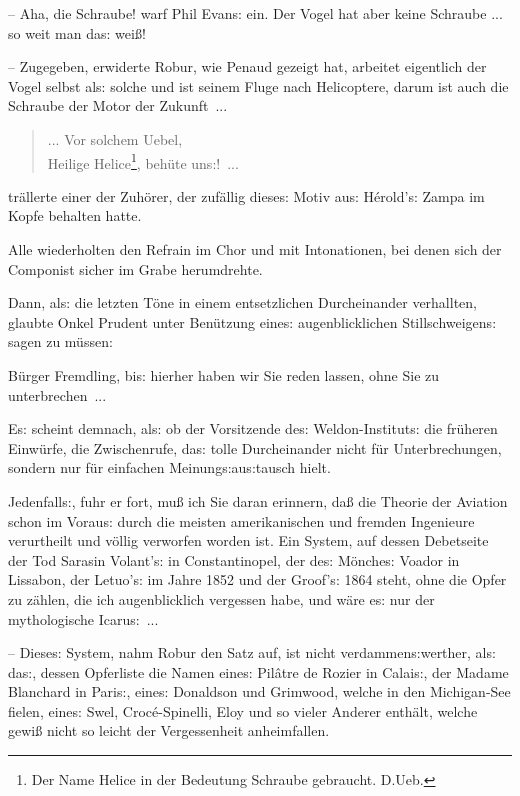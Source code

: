 \documentclass[oneside,12pt]{book}
\newcommand{\s}{s:}
\begin{document}
-- Aha, die Schraube! warf Phil Evan{\s} ein. Der Vogel hat aber
keine Schraube ... so weit man da{\s} wei{\ss}!

-- Zugegeben, erwiderte Robur, wie Penaud gezeigt hat, arbeitet
eigentlich der Vogel selbst al{\s} solche und ist seinem Fluge nach
Helicoptere, darum ist auch die Schraube der Motor der Zukunft~...

\begin{quote}
... {\glqq}Vor solchem Uebel,\\
Heilige Helice\footnote[1]{\frakfamily Der Name Helice in der Bedeutung
Schraube gebraucht. \hfill D.Ueb.}, beh\"ute un{\s}!{\grqq}~...
\end{quote}

tr\"allerte einer der Zuh\"orer, der zuf\"allig diese{\s} Motiv
au{\s} H\'erold'{\s} Zampa im Kopfe behalten hatte.

Alle wiederholten den Refrain im Chor und mit Intonationen, bei denen
sich der Componist sicher im Grabe herumdrehte.

Dann, al{\s} die letzten T\"one in einem entsetzlichen Durcheinander
verhallten, glaubte Onkel Prudent unter Ben\"utzung eine{\s}
augenblicklichen Stillschweigen{\s} sagen zu m\"ussen:

{\glqq}B\"urger Fremdling, bi{\s} hierher haben wir Sie reden lassen,
ohne Sie zu unterbrechen~...{\grqq}

E{\s} scheint demnach, al{\s} ob der Vorsitzende de{\s}
Weldon-Institut{\s} die fr\"uheren Einw\"urfe, die Zwischenrufe,
da{\s} tolle Durcheinander nicht f\"ur Unterbrechungen, sondern nur
f\"ur einfachen Meinung{\s}au{\s}tausch hielt.

{\glqq}Jedenfall{\s}, fuhr er fort, mu{\ss} ich Sie daran erinnern,
da{\ss} die Theorie der Aviation schon im Vorau{\s} durch die meisten
amerikanischen und fremden Ingenieure verurtheilt und v\"ollig
verworfen worden ist. Ein System, auf dessen Debetseite der Tod
Sarasin Volant'{\s} in Constantinopel, der de{\s} M\"onche{\s} Voador
in Lissabon, der Letuo'{\s} im Jahre 1852 und der Groof'{\s} 1864
steht, ohne die Opfer zu z\"ahlen, die ich augenblicklich vergessen
habe, und w\"are e{\s} nur der mythologische Icaru{\s}~...

-- Diese{\s} System, nahm Robur den Satz auf, ist nicht
verdammen{\s}werther, al{\s} da{\s}, dessen Opferliste die Namen
eine{\s} Pil\^atre de Rozier in Calai{\s}, der Madame Blanchard in
Pari{\s}, eine{\s} Donaldson und Grimwood, welche in den Michigan-See
fielen, eine{\s} Swel, Croc\'e-Spinelli, Eloy und so vieler Anderer
enth\"alt, welche gewi{\ss} nicht so leicht der Vergessenheit
anheimfallen.{\grqq}
\end{document}
